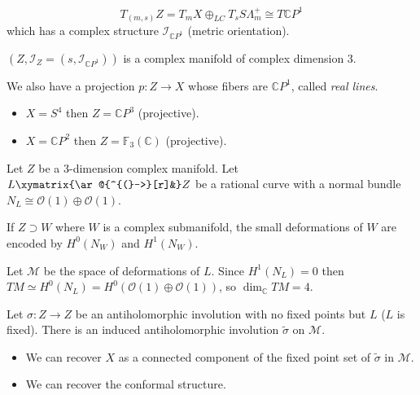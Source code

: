 \documentclass{book}
\begin{document}
$$
T_{(m,s)}Z=
T_mX \oplus_{LC}T_sS \Lambda^+_m
\cong T\mathbb{C}P^1
$$
which has a complex structure
$\mathcal{I}_{\mathbb{C}P^1}$
(metric orientation).

\begin{theorem}
\label{theorem-twistor-space}
$(Z,\mathcal{I}_Z=(s,\mathcal{I}_{\mathbb{C}
P^1}))$
is a complex manifold of complex dimension 3.
\end{theorem}

\noindent
We also have a projection $p:Z \to X $
whose fibers are $\mathbb{C}P^1$,
called {\it real lines}.

\begin{example}
\label{example-twistor-space}
\begin{itemize}
\item $X=S^4$ then $Z=\mathbb{C}P^3$
(projective).
\item $X=\mathbb{C}P^2$ then
$Z=\mathbb{F}_3(\mathbb{C})$ (projective).
\end{itemize}
\end{example}

Let $Z$ be a 3-dimension complex manifold.
Let $L \xymatrix{\ar@{^{(}->}[r]&} Z$
be a rational curve with a normal bundle
$N_L \cong \mathcal{O}(1) \oplus
\mathcal{O}(1)$.

\begin{remark}
\label{remark-small-deformations}
If $Z \supset W$ where $W$ is a complex
submanifold,
the small deformations of $W$ are encoded by
$H^0(N_W)$ and $H^1(N_W)$.
\end{remark}

Let $\mathcal{M}$ be the space of
deformations of $L$.
Since $H^1(N_L)=0$ then
$TM \simeq H^0(N_L) = H^0(\mathcal{O}(1)
\oplus \mathcal{O}(1))$,
so $\dim_\mathbb{C}TM=4$.

Let $\sigma:Z \to Z$ be an antiholomorphic
involution with no fixed points but $L$ ($L$
is fixed). There is an induced
antiholomorphic involution $\tilde{\sigma}$
on $\mathcal{M}$.

\begin{remark}
\label{remark-antiholomorphic-involution}
\begin{itemize}
\item We can recover $X$ as a connected
component
of the fixed point set of $\tilde{\sigma}$ in
$\mathcal{M}$.
\item We can recover the
conformal structure.
\end{itemize}
\end{remark}
\end{document}
